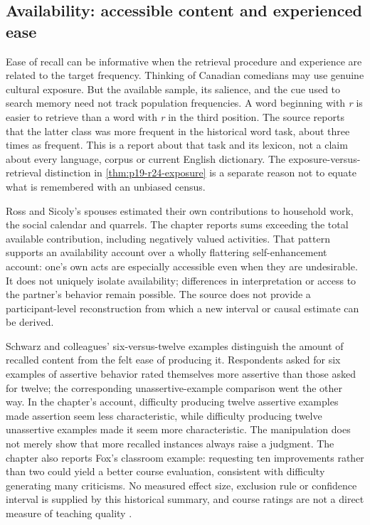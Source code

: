 \subsection{Availability: accessible content and experienced ease}

Ease of recall can be informative when the retrieval procedure and
experience are related to the target frequency. Thinking of Canadian
comedians may use genuine cultural exposure. But the available sample,
its salience, and the cue used to search memory need not track population
frequencies. A word beginning with \emph{r} is easier to retrieve than a
word with \emph{r} in the third position. The source reports that the latter
class was more frequent in the historical word task, about three times
as frequent. This is a report about that task and its lexicon, not a
claim about every language, corpus or current English dictionary.
The exposure-versus-retrieval distinction in
\cref{thm:p19-r24-exposure} is a separate reason not to equate what is
remembered with an unbiased census.

Ross and Sicoly's spouses estimated their own contributions to household
work, the social calendar and quarrels. The chapter reports sums exceeding
the total available contribution, including negatively valued activities.
That pattern supports an availability account over a wholly flattering
self-enhancement account: one's own acts are especially accessible even
when they are undesirable. It does not uniquely isolate availability;
differences in interpretation or access to the partner's behavior remain
possible. The source does not provide a participant-level reconstruction
from which a new interval or causal estimate can be derived.

Schwarz and colleagues' six-versus-twelve examples distinguish the amount
of recalled content from the felt ease of producing it. Respondents asked
for six examples of assertive behavior rated themselves more assertive
than those asked for twelve; the corresponding unassertive-example
comparison went the other way. In the chapter's account, difficulty
producing twelve assertive examples made assertion seem less characteristic,
while difficulty producing twelve unassertive examples made it seem more
characteristic. The manipulation does not merely show that more recalled
instances always raise a judgment. The chapter also reports Fox's classroom
example: requesting ten improvements rather than two could yield a better
course evaluation, consistent with difficulty generating many criticisms.
No measured effect size, exclusion rule or confidence interval is supplied
by this historical summary, and course ratings are not a direct measure
of teaching quality
\cite[pp.~330--331]{GriffinEtAl2012HeuristicsHistory}.

